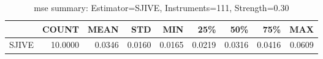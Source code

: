 \begin{table}[ht]
\centering
\caption{mse summary: Estimator=SJIVE, Instruments=111, Strength=0.30}
\begin{tabular}{lrrrrrrrr}
\toprule
 & COUNT & MEAN & STD & MIN & 25\% & 50\% & 75\% & MAX \\
\midrule
SJIVE & 10.0000 & 0.0346 & 0.0160 & 0.0165 & 0.0219 & 0.0316 & 0.0416 & 0.0609 \\
\bottomrule
\end{tabular}
\end{table}

